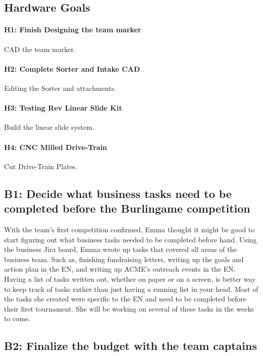 \documentclass{article}
\begin{document}
\subsection{Hardware Goals}
\paragraph{H1: Finish Designing the team marker}
 CAD the team marker.
\paragraph{H2: Complete Sorter and Intake CAD}
 Editing the Sorter and attachments.
\paragraph{H3: Testing Rev Linear Slide Kit}
 Build the linear slide system. 
\paragraph{H4: CNC Milled Drive-Train }
 Cut Drive-Train Plates.
\newpage
\subsection{B1: Decide what business tasks need to be completed before the Burlingame competition}

With the team's first competition confirmed, Emma thought it might be good to start figuring out what business tasks needed to be completed before hand. Using the business Jira board, Emma wrote up tasks that covered all areas of the business team. Such as, finishing fundraising letters, writing up the goals and action plan in the EN, and writing up ACME's outreach events in the EN. Having a list of tasks written out, whether on paper or on a screen, is better way to keep track of tasks rather than just having a running list in your head. Most of the tasks she created were specific to the EN and need to be completed before their first tournament. She will be working on several of these tasks in the weeks to come.

\subsection{B2: Finalize the budget with the team captains}
\end{document}
